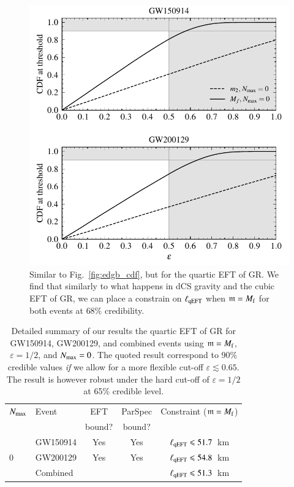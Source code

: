\documentclass[twocolumn,
               prd,
               aps,
               superscriptaddress,
               tightenlines,
               nofootinbib,
               eqsecnum,
               amsfonts,
               amsmath,
               longbibliography]{revtex4-1}
\newcommand{\gm}{\mathfrak{m}}
\newcommand{\hs}[1]{{\textcolor{TealBlue}{{#1}}}}
\begin{document}
\begin{figure}[t]
\includegraphics[width=\columnwidth]{figs/qeft_cdf_varying_threshold_corrected.pdf}
\caption{Similar to Fig.~\ref{fig:edgb_cdf}, but for the quartic EFT of GR.
We find that similarly to what happens in dCS gravity and the cubic EFT of GR, we
can place a constrain on $\ell_{\rm qEFT}$ when $\gm = M_{\rm f}$ for both events at \hs{68\% credibility}.
}
\label{fig:qEFT_cdf}
\end{figure}

\begin{table}[h]
\begin{tabular}{l l c c c}
\hline
\hline
$N_{\rm max}$ & Event & EFT    & ParSpec & Constraint ($\gm = M_{\rm f}$) \\
              &       & bound? & bound?  &                            \\
\hline
  & GW150914 & Yes & Yes  & $\ell_{\rm qEFT} \leqslant 51.7$~km \\
0 & GW200129 & Yes & Yes  & $\ell_{\rm qEFT} \leqslant 54.8$~km \\
  & Combined &     &      & \cellcolor{black!10}$\ell_{\rm qEFT} \leqslant 51.3$~km \\
\hline
\hline
\end{tabular}
\caption{Detailed summary of our results the quartic EFT of GR for GW150914, GW200129, and
combined events using $\gm = M_{\rm f}$, $\varepsilon = 1/2$, and $N_{\rm max} = 0$. The quoted
result correspond \hs{to 90\% credible values \emph{if} we allow for a more flexible cut-off $\varepsilon \lesssim 0.65$.
The result is however robust under the hard cut-off of $\varepsilon = 1/2$ at 65\% credible level.}
}
\label{tab:summary_qeft}
\end{table}
\end{document}
